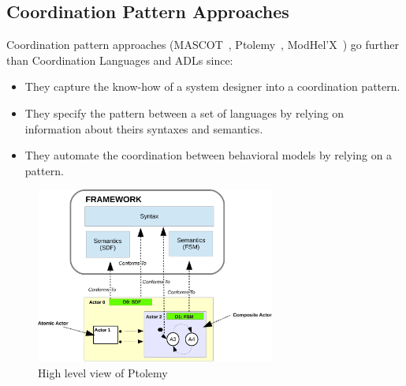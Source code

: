 \subsection{Coordination Pattern Approaches}



Coordination pattern approaches (\eg MASCOT~\cite{mascotbib}, Ptolemy~\cite{ptoleframebib}, ModHel'X~\cite{modhelxbib}) go further than Coordination Languages and ADLs since:          
\begin{itemize}
   \item They capture the know-how of a system designer into a coordination pattern. 
   \item They specify the pattern between a set of languages by relying on information about theirs syntaxes and semantics. 
   \item They automate the coordination between behavioral models by relying on a pattern.
\end{itemize}     	     	
\begin{figure}
\begin{center}
\includegraphics[width=0.7\textwidth]{background/figs/ptolemyfig}
\caption{High level view of Ptolemy~\cite{giraultbib}}
         			\label{fig:ptolemyfig}
         		\end{center}
\end{figure}
         	
